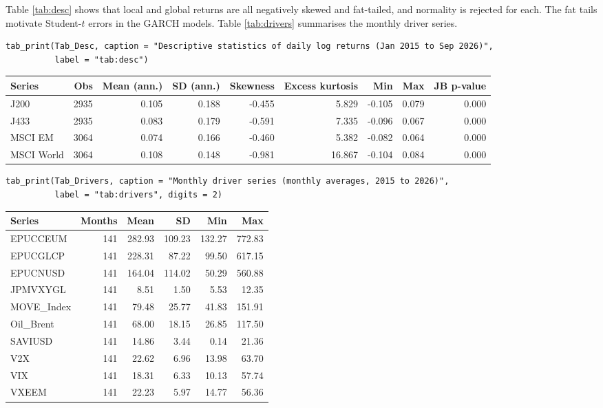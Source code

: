 \documentclass[11pt,preprint]{elsarticle}
\let\origtable\table
\let\endorigtable\endtable
\renewenvironment{table}[1][2] {
    \expandafter\origtable\expandafter[H]
} {
    \endorigtable
}
\numberwithin{equation}{section}
\numberwithin{figure}{section}
\numberwithin{table}{section}
\begin{document}
Table \ref{tab:desc} shows that local and global returns are all
negatively skewed and fat-tailed, and normality is rejected for each.
The fat tails motivate Student-\(t\) errors in the GARCH models. Table
\ref{tab:drivers} summarises the monthly driver series.

\begin{verbatim}
tab_print(Tab_Desc, caption = "Descriptive statistics of daily log returns (Jan 2015 to Sep 2026)",
          label = "tab:desc")
\end{verbatim}

\begin{table}[!htbp]
\centering
\caption{Descriptive statistics of daily log returns (Jan 2015 to Sep 2026)} 
\label{tab:desc}
\begingroup\footnotesize
\begin{tabular}{lrrrrrrrr}
  \hline
Series & Obs & Mean (ann.) & SD (ann.) & Skewness & Excess kurtosis & Min & Max & JB p-value \\ 
  \hline
J200 & 2935 & 0.105 & 0.188 & -0.455 & 5.829 & -0.105 & 0.079 & 0.000 \\ 
  J433 & 2935 & 0.083 & 0.179 & -0.591 & 7.335 & -0.096 & 0.067 & 0.000 \\ 
  MSCI EM & 3064 & 0.074 & 0.166 & -0.460 & 5.382 & -0.082 & 0.064 & 0.000 \\ 
  MSCI World & 3064 & 0.108 & 0.148 & -0.981 & 16.867 & -0.104 & 0.084 & 0.000 \\ 
   \hline
\end{tabular}
\endgroup
\end{table}

\begin{verbatim}
tab_print(Tab_Drivers, caption = "Monthly driver series (monthly averages, 2015 to 2026)",
          label = "tab:drivers", digits = 2)
\end{verbatim}

\begin{table}[!htbp]
\centering
\caption{Monthly driver series (monthly averages, 2015 to 2026)} 
\label{tab:drivers}
\begingroup\footnotesize
\begin{tabular}{lrrrrr}
  \hline
Series & Months & Mean & SD & Min & Max \\ 
  \hline
EPUCCEUM & 141 & 282.93 & 109.23 & 132.27 & 772.83 \\ 
  EPUCGLCP & 141 & 228.31 & 87.22 & 99.50 & 617.15 \\ 
  EPUCNUSD & 141 & 164.04 & 114.02 & 50.29 & 560.88 \\ 
  JPMVXYGL & 141 & 8.51 & 1.50 & 5.53 & 12.35 \\ 
  MOVE\_Index & 141 & 79.48 & 25.77 & 41.83 & 151.91 \\ 
  Oil\_Brent & 141 & 68.00 & 18.15 & 26.85 & 117.50 \\ 
  SAVIUSD & 141 & 14.86 & 3.44 & 0.14 & 21.36 \\ 
  V2X & 141 & 22.62 & 6.96 & 13.98 & 63.70 \\ 
  VIX & 141 & 18.31 & 6.33 & 10.13 & 57.74 \\ 
  VXEEM & 141 & 22.23 & 5.97 & 14.77 & 56.36 \\ 
   \hline
\end{tabular}
\endgroup
\end{table}
\end{document}
